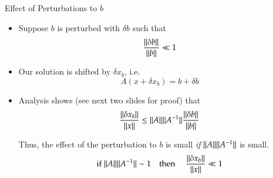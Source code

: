 \documentclass[10pt]{beamer}
\begin{document}
\begin{frame}{Effect of Perturbations to $b$}
\begin{itemize}
    \item Suppose $b$ is perturbed with $\delta b$ such that
        \begin{equation*}
            \frac{{{\|\delta b\|}}}{{{\|b\|}}} \ll 1
        \end{equation*}
    \item Our solution is shifted by $\delta x_b$, i.e. 
        \begin{equation*}
            A (x + \delta x_b) = b + \delta b
        \end{equation*}


    \item Analysis shows (see next two slides for proof) that
        \begin{equation*}
            \frac{{{\|\delta x_b\|}}}{{{\|x\|}}} \le {\ensuremath{{\|A\|}}}{\ensuremath{{\|A^{-1}\|}}} \frac{{{\|\delta b\|}}}{{{{\|b\|}}}}
        \end{equation*}

Thus, the effect of the perturbation to $b$ is small
\emph{if} ${{\|A\|}}{{\|A^{-1}\|}}$ is small.
\begin{equation*}
    \text{if }{\ensuremath{{\|A\|}}}{\ensuremath{{\|A^{-1}\|}}} \sim 1
    \ \ \ \ \text{then }
    \ \ \ \ \frac{{{\|\delta x_b\|}}}{{{\|x\|}}} \ll 1
\end{equation*}

\end{itemize}
\end{frame}
\end{document}
